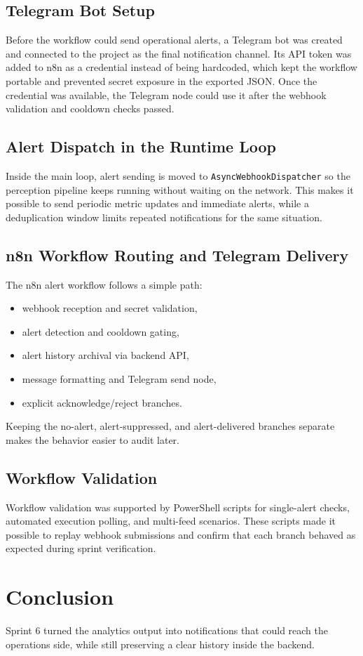 \subsection{Telegram Bot Setup}
Before the workflow could send operational alerts, a Telegram bot was created and connected to the project as the final notification channel. Its API token was added to n8n as a credential instead of being hardcoded, which kept the workflow portable and prevented secret exposure in the exported JSON. Once the credential was available, the Telegram node could use it after the webhook validation and cooldown checks passed.

\subsection{Alert Dispatch in the Runtime Loop}
Inside the main loop, alert sending is moved to \texttt{AsyncWebhookDispatcher} so the perception pipeline keeps running without waiting on the network. This makes it possible to send periodic metric updates and immediate alerts, while a deduplication window limits repeated notifications for the same situation.

\subsection{n8n Workflow Routing and Telegram Delivery}
The n8n alert workflow follows a simple path:
\begin{itemize}
    \item webhook reception and secret validation,
    \item alert detection and cooldown gating,
    \item alert history archival via backend API,
    \item message formatting and Telegram send node,
    \item explicit acknowledge/reject branches.
\end{itemize}
Keeping the no-alert, alert-suppressed, and alert-delivered branches separate makes the behavior easier to audit later.

\subsection{Workflow Validation}
Workflow validation was supported by PowerShell scripts for single-alert checks, automated execution polling, and multi-feed scenarios. These scripts made it possible to replay webhook submissions and confirm that each branch behaved as expected during sprint verification.

\section{Conclusion}
Sprint 6 turned the analytics output into notifications that could reach the operations side, while still preserving a clear history inside the backend.
